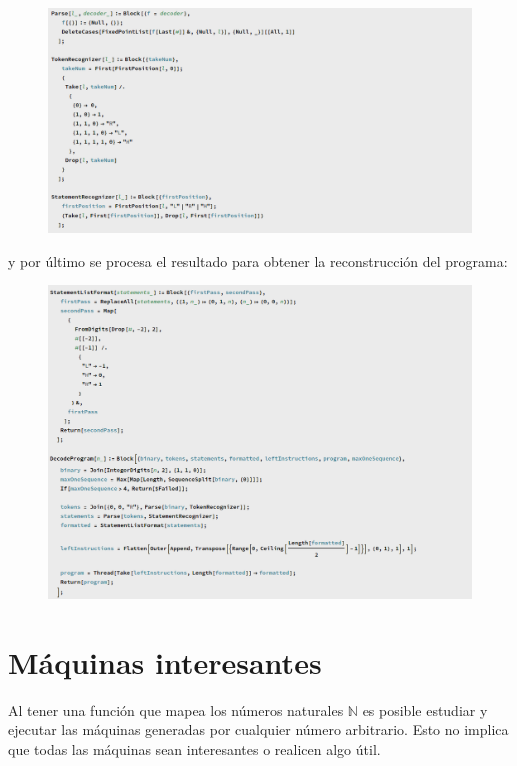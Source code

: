 \documentclass[10pt,a4paper]{article}
\begin{document}
\begin{figure}[h!tb!]
	\centering
	\includegraphics[scale=0.35]{../img/decoding_parser.png}
\end{figure}

y por último se procesa el resultado para obtener la reconstrucción del programa:
\begin{figure}[h!tb!]
	\centering
	\includegraphics[scale=0.35]{../img/decoding_frontend.png}
\end{figure}

\clearpage

\section{Máquinas interesantes}
Al tener una función que mapea los números naturales $\mathbb{N}$ es posible estudiar y ejecutar las máquinas generadas por cualquier número arbitrario. Esto no implica que todas las máquinas sean interesantes o realicen algo útil.
\end{document}

